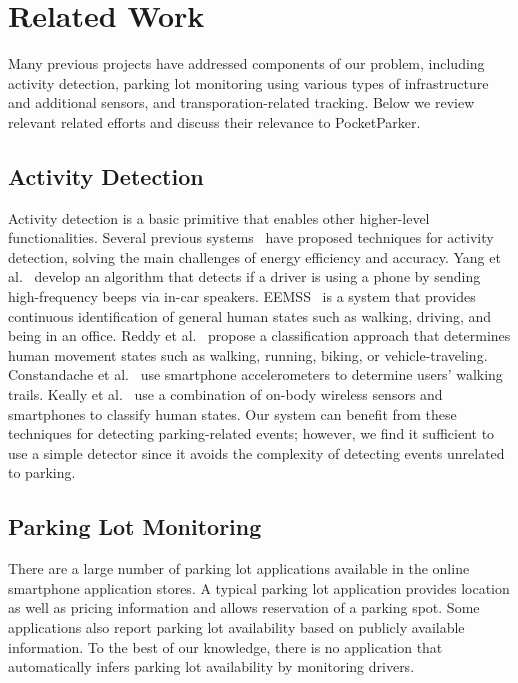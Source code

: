 \section{Related Work}
\label{sec-related}

Many previous projects have addressed components of our problem, including
activity detection, parking lot monitoring using various types of
infrastructure and additional sensors, and transporation-related tracking.
Below we review relevant related efforts and discuss their relevance to
PocketParker.

\subsection{Activity Detection}

Activity detection is a basic primitive that enables other higher-level
functionalities. Several previous systems~\cite{Constandache:2010:DYS,
Keally:2011:PTP, Reddy:2010:UMP, Yang:2011:DDP, Wang:2009:FEE} have proposed
techniques for activity detection, solving the main challenges of energy
efficiency and accuracy. Yang et al.~\cite{Yang:2011:DDP} develop an algorithm
that detects if a driver is using a phone by sending high-frequency beeps via
in-car speakers. EEMSS~\cite{Wang:2009:FEE} is a system that provides continuous
identification of general human states such as walking, driving, and being in an
office. Reddy et al.~\cite{Reddy:2010:UMP} propose a classification approach
that determines human movement states such as walking, running, biking, or
vehicle-traveling. Constandache et al.~\cite{Constandache:2010:DYS} use 
smartphone accelerometers to determine users' walking trails. Keally et
al.~\cite{Keally:2011:PTP} use a combination of on-body wireless sensors and
smartphones to classify human states. Our system can benefit from these
techniques for detecting parking-related events; however, we find it sufficient
to use a simple detector since it avoids the complexity of detecting events
unrelated to parking.

\subsection{Parking Lot Monitoring}

There are a large number of parking lot applications available in the online
smartphone application stores. A typical parking lot application provides
location as well as pricing information and allows reservation of a parking
spot. Some applications also report parking lot availability based on publicly
available information. To the best of our knowledge, there is no application
that automatically infers parking lot availability by monitoring drivers.

